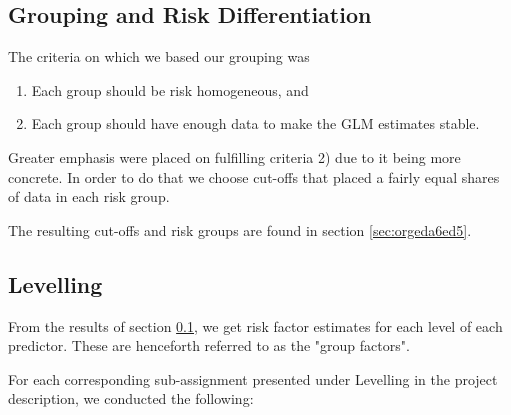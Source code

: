 \documentclass[11pt]{article}
\begin{document}
\subsection{Grouping and Risk Differentiation}
\label{sec:org5cb8f4b}

The criteria on which we based our grouping was

\begin{enumerate}
\item Each group should be risk homogeneous, and
\item Each group should have enough data to make the GLM estimates stable.
\end{enumerate}
Greater emphasis were placed on fulfilling criteria 2) due to it being more concrete. In order to do that
we choose cut-offs that placed a fairly equal shares of data in each risk group. 

The resulting cut-offs and risk groups are found in section \ref{sec:orgeda6ed5}.

\subsection{Levelling}
\label{sec:orga762c5e}

From the results of section \ref{sec:org5cb8f4b}, we get risk factor estimates for each
level of each predictor. These are henceforth referred to as the "group factors".

For each corresponding sub-assignment presented under Levelling in the project description, we conducted the
following:
\end{document}
